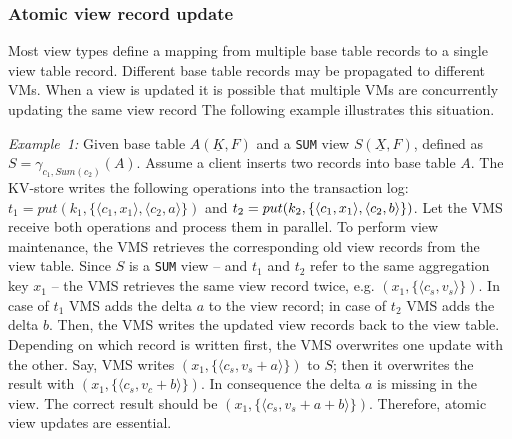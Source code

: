 
\subsubsection{Atomic view record update}
\label{subsubsec:atomic_update} 

Most view types define a mapping from multiple base table records to 
a single view table record. Different base table records may be 
propagated to different VMs. When a view is updated it is possible that 
multiple VMs are concurrently updating the same view record The following 
example illustrates this situation.

\noindent
\textit{Example~1:} Given base table $A(\underline{K}, F)$ and a \texttt{SUM} 
view $S(\underline{X}, F)$, defined as $S=\gamma_{c_1,Sum(c_2)}(A)$. 
Assume a client inserts two records into base table $A$. The KV-store writes the following 
operations into the transaction log: $t_1=put(k_1,\{\langle 
c_1,x_1\rangle,\langle c_2,a\rangle\})$ and $t_2=put(k_2, \{\langle 
c_1,x_1 \rangle,\linebreak \langle c_2,b\rangle\})$. Let the VMS receive both 
operations and process them in parallel. To perform view maintenance, 
the VMS retrieves the corresponding old view records from the view 
table. Since $S$ is a \texttt{SUM} view -- and $t_1$ and $t_2$ refer to 
the same aggregation key $x_1$ -- the VMS retrieves the same view record 
twice, e.g. $(x_1, \{\langle c_s, v_s\rangle\})$. In case of $t_1$ VMS 
adds the delta $a$ to the view record; in case of $t_2$ VMS adds the 
delta $b$. Then, the VMS writes the updated view records back to the 
view table. Depending on which record is written first, the VMS 
overwrites one update with the other. Say, VMS writes $(x_1, \{\langle 
c_s, v_s+a \rangle\})$ to $S$; then it overwrites the result with 
$(x_1,\{\langle c_s, v_c+b\rangle\})$. In consequence the delta $a$ is 
missing in the view. The correct result should be $(x_1,\{\langle c_s, 
v_s+a+b \rangle\})$. Therefore, atomic view updates are essential. 




